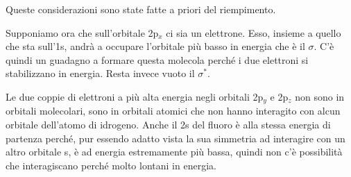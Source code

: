 \vspace{0.2cm}Queste considerazioni sono state fatte a priori del riempimento.

Supponiamo ora che sull'orbitale 2p$_x$ ci sia un elettrone. Esso, insieme a quello che sta sull'1s, andrà a occupare l'orbitale più basso in energia che è il $\sigma$. C'è quindi un guadagno a formare questa molecola perché i due elettroni si stabilizzano in energia. Resta invece vuoto il $\sigma^*$.

Le due coppie di elettroni a più alta energia negli orbitali 2p$_y$ e 2p$_z$ non sono in orbitali molecolari, sono in orbitali atomici che non hanno interagito con alcun orbitale dell'atomo di idrogeno. Anche il 2s del fluoro è alla stessa energia di partenza perché, pur essendo adatto vista la sua simmetria ad interagire con un altro orbitale s, è ad energia estremamente più bassa, quindi non c'è possibilità che interagiscano perché molto lontani in energia.

